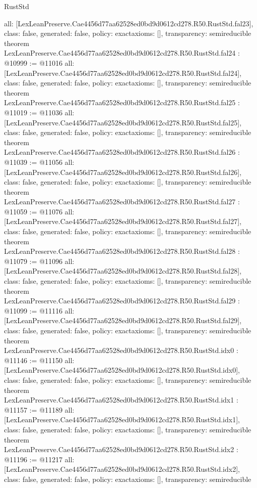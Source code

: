 \begin{lexlean}{RustStd}
\begin{coremodule}
{  all: [LexLeanPreserve.Cae4456d77aa62528ed0bd9d0612cd278.R50.RustStd.fal23],
  class: false,
  generated: false,
  policy: exact{axioms: []},
  transparency: semireducible
}
theorem LexLeanPreserve.Cae4456d77aa62528ed0bd9d0612cd278.R50.RustStd.fal24 : @10999 := @11016 {
  all: [LexLeanPreserve.Cae4456d77aa62528ed0bd9d0612cd278.R50.RustStd.fal24],
  class: false,
  generated: false,
  policy: exact{axioms: []},
  transparency: semireducible
}
theorem LexLeanPreserve.Cae4456d77aa62528ed0bd9d0612cd278.R50.RustStd.fal25 : @11019 := @11036 {
  all: [LexLeanPreserve.Cae4456d77aa62528ed0bd9d0612cd278.R50.RustStd.fal25],
  class: false,
  generated: false,
  policy: exact{axioms: []},
  transparency: semireducible
}
theorem LexLeanPreserve.Cae4456d77aa62528ed0bd9d0612cd278.R50.RustStd.fal26 : @11039 := @11056 {
  all: [LexLeanPreserve.Cae4456d77aa62528ed0bd9d0612cd278.R50.RustStd.fal26],
  class: false,
  generated: false,
  policy: exact{axioms: []},
  transparency: semireducible
}
theorem LexLeanPreserve.Cae4456d77aa62528ed0bd9d0612cd278.R50.RustStd.fal27 : @11059 := @11076 {
  all: [LexLeanPreserve.Cae4456d77aa62528ed0bd9d0612cd278.R50.RustStd.fal27],
  class: false,
  generated: false,
  policy: exact{axioms: []},
  transparency: semireducible
}
theorem LexLeanPreserve.Cae4456d77aa62528ed0bd9d0612cd278.R50.RustStd.fal28 : @11079 := @11096 {
  all: [LexLeanPreserve.Cae4456d77aa62528ed0bd9d0612cd278.R50.RustStd.fal28],
  class: false,
  generated: false,
  policy: exact{axioms: []},
  transparency: semireducible
}
theorem LexLeanPreserve.Cae4456d77aa62528ed0bd9d0612cd278.R50.RustStd.fal29 : @11099 := @11116 {
  all: [LexLeanPreserve.Cae4456d77aa62528ed0bd9d0612cd278.R50.RustStd.fal29],
  class: false,
  generated: false,
  policy: exact{axioms: []},
  transparency: semireducible
}
theorem LexLeanPreserve.Cae4456d77aa62528ed0bd9d0612cd278.R50.RustStd.idx0 : @11146 := @11150 {
  all: [LexLeanPreserve.Cae4456d77aa62528ed0bd9d0612cd278.R50.RustStd.idx0],
  class: false,
  generated: false,
  policy: exact{axioms: []},
  transparency: semireducible
}
theorem LexLeanPreserve.Cae4456d77aa62528ed0bd9d0612cd278.R50.RustStd.idx1 : @11157 := @11189 {
  all: [LexLeanPreserve.Cae4456d77aa62528ed0bd9d0612cd278.R50.RustStd.idx1],
  class: false,
  generated: false,
  policy: exact{axioms: []},
  transparency: semireducible
}
theorem LexLeanPreserve.Cae4456d77aa62528ed0bd9d0612cd278.R50.RustStd.idx2 : @11196 := @11217 {
  all: [LexLeanPreserve.Cae4456d77aa62528ed0bd9d0612cd278.R50.RustStd.idx2],
  class: false,
  generated: false,
  policy: exact{axioms: []},
  transparency: semireducible
}
\end{coremodule}
\end{lexlean}
